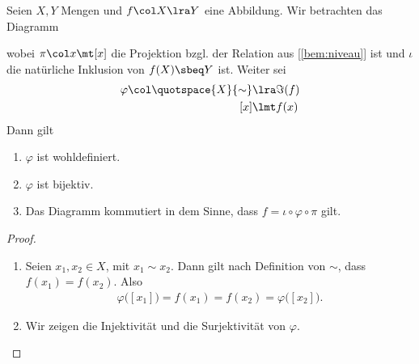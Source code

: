 \begin{satz}

  Seien $X,Y$ Mengen und $f\col X \lra Y$ eine Abbildung. Wir betrachten das
  Diagramm

  \begin{center}
  \end{center}
  
  \noindent wobei $\pi\col x \mt [x]$ die Projektion bzgl. der Relation aus
  [\ref{bem:niveau}] ist und $\iota$ die natürliche Inklusion von
  $f(X)\sbeq Y$ ist. Weiter sei
  \begin{align*} 
    \varphi\col \quotspace{X}{\sim} &\lra \Im(f) \\
    [x] &\lmt f(x)
  \end{align*}
  Dann gilt
  \begin{enumerate}
    \item $\varphi$ ist wohldefiniert.
    \item $\varphi$ ist bijektiv.
    \item Das Diagramm kommutiert in dem Sinne, dass $f = \iota\circ \varphi
      \circ \pi$ gilt.
  \end{enumerate}

  \begin{proof}
  \quad
  
  \begin{enumerate}

    \item Seien $x_{1},x_{2}\in X$, mit $x_{1}\sim x_{2}$. Dann gilt
      nach Definition von $\sim$, dass $f(x_{1}) = f(x_{2})$. Also
      \begin{align*}
        \varphi\big([x_{1}]\big) = f(x_{1}) = f(x_{2}) = \varphi\big([x_{2}]\big).
      \end{align*}

    \item Wir zeigen die Injektivität und die Surjektivität von
      $\varphi$.
      \begin{itemize}


\end{itemize}
\end{enumerate}
\end{proof}
\end{satz}
